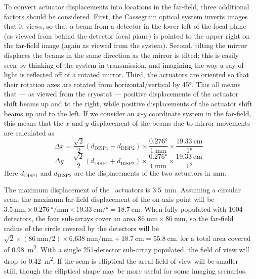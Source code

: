 To convert actuator displacements into locations in the far-field, three additional factors should be considered.
First, the Cassegrain optical system inverts images that it views, so that a beam from a detector in the lower left of the focal plane (as viewed from behind the detector focal plane) is pointed to the upper right on the far-field image (again as viewed from the system).
Second, tilting the mirror displaces the beams in the same direction as the mirror is tilted; this is easily seen by thinking of the system in transmission, and imagining the way a ray of light is reflected off of a rotated mirror.
Third, the actuators are oriented so that their rotation axes are rotated from horizontal/vertical by \ang{45}.
This all means that --- as viewed from the cryostat --- positive displacements of the  actuator shift beams up and to the right, while positive displacements of the  actuator shift beams up and to the left.
If we consider an $x$-$y$ coordinate system in the far-field, this means that the $x$ and $y$ displacement of the beams due to mirror movements are calculated as
\begin{equation} \label{eqn:ch5-bose-to-x}
\Delta x = \frac{\sqrt{2}}{2} \left( d_{\text{DISP1}} - d_{\text{DISP2}} \right) \times
    \frac{\ang{0.276}} {\SI{1}{\mm}} \times
    \frac{\SI{19.33}{\cm}} {\ang{1}}
\end{equation}
\begin{equation} \label{eqn:ch5-bose-to-y}
\Delta y = \frac{\sqrt{2}}{2} \left( d_{\text{DISP1}} + d_{\text{DISP2}} \right) \times
    \frac{\ang{0.276}} {\SI{1}{\mm}} \times
    \frac{\SI{19.33}{\cm}} {\ang{1}}
\end{equation}
Here $d_{\text{DISP1}}$ and $d_{\text{DISP2}}$ are the displacements of the two actuators in \si{\mm}.

The maximum displacement of the \BOSE\ actuators is \SI{3.5}{\mm}.
Assuming a circular scan, the maximum far-field displacement of the on-axis point will be $\SI{3.5}{\mm} \times \SI[per-mode=symbol]{0.276}{\degree\per\mm} \times \SI[per-mode=symbol]{19.33}{\cm\per\degree} = \SI{18.7}{\cm}$.
When fully populated with 1004 detectors, the four sub-arrays cover an area $\SI{86}{\mm} \times \SI{86}{\mm}$, so the far-field radius of the circle covered by the detectors will be $\sqrt{2} \times (\SI{86}{\mm}/2) \times \SI{6.638}{\mm\per\mm} + \SI{18.7}{\cm} = \SI{55.8}{\cm}$, for a total area covered of \SI{.98}{\m^2}.
With a single 251-detector sub-array populated, the field of view will drop to \SI{0.42}{\m^2}.
If the scan is elliptical the areal field of view will be smaller still, though the elliptical shape may be more useful for some imaging scenarios.

